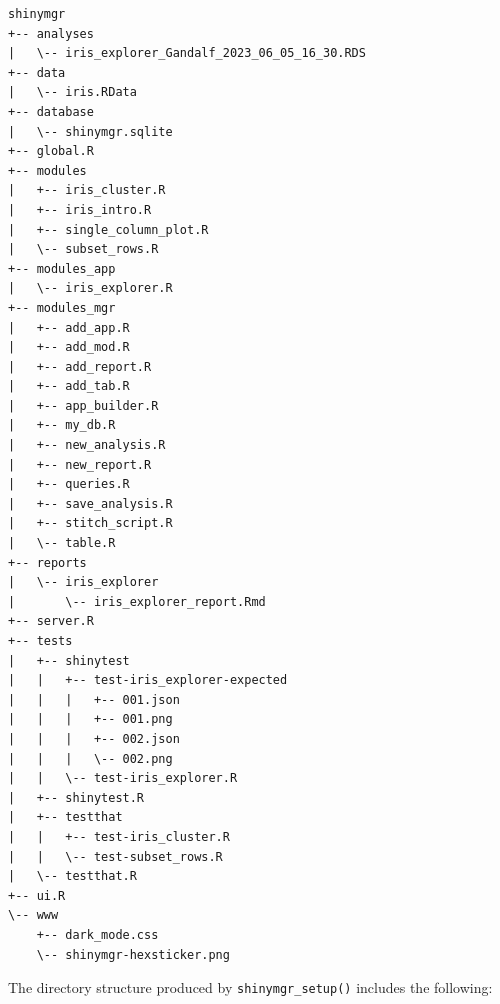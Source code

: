\begin{verbatim}
shinymgr
+-- analyses
|   \-- iris_explorer_Gandalf_2023_06_05_16_30.RDS
+-- data
|   \-- iris.RData
+-- database
|   \-- shinymgr.sqlite
+-- global.R
+-- modules
|   +-- iris_cluster.R
|   +-- iris_intro.R
|   +-- single_column_plot.R
|   \-- subset_rows.R
+-- modules_app
|   \-- iris_explorer.R
+-- modules_mgr
|   +-- add_app.R
|   +-- add_mod.R
|   +-- add_report.R
|   +-- add_tab.R
|   +-- app_builder.R
|   +-- my_db.R
|   +-- new_analysis.R
|   +-- new_report.R
|   +-- queries.R
|   +-- save_analysis.R
|   +-- stitch_script.R
|   \-- table.R
+-- reports
|   \-- iris_explorer
|       \-- iris_explorer_report.Rmd
+-- server.R
+-- tests
|   +-- shinytest
|   |   +-- test-iris_explorer-expected
|   |   |   +-- 001.json
|   |   |   +-- 001.png
|   |   |   +-- 002.json
|   |   |   \-- 002.png
|   |   \-- test-iris_explorer.R
|   +-- shinytest.R
|   +-- testthat
|   |   +-- test-iris_cluster.R
|   |   \-- test-subset_rows.R
|   \-- testthat.R
+-- ui.R
\-- www
    +-- dark_mode.css
    \-- shinymgr-hexsticker.png
\end{verbatim}

The directory structure produced by \texttt{shinymgr\_setup()} includes the following:

